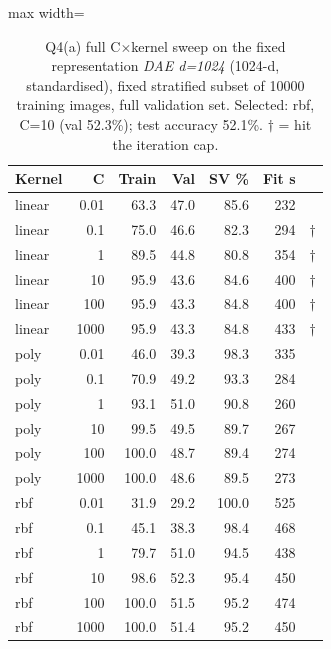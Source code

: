\begin{table}[t]
\centering
\footnotesize
\setlength{\tabcolsep}{3.5pt}
\begin{adjustbox}{max width=\linewidth}
\begin{tabular}{lrrrrrr}
\toprule
Kernel & C & Train & Val & SV \% & Fit s &  \\
\midrule
linear & 0.01 & 63.3 & 47.0 & 85.6 & 232 &  \\
linear & 0.1 & 75.0 & 46.6 & 82.3 & 294 & $\dagger$ \\
linear & 1 & 89.5 & 44.8 & 80.8 & 354 & $\dagger$ \\
linear & 10 & 95.9 & 43.6 & 84.6 & 400 & $\dagger$ \\
linear & 100 & 95.9 & 43.3 & 84.8 & 400 & $\dagger$ \\
linear & 1000 & 95.9 & 43.3 & 84.8 & 433 & $\dagger$ \\
poly & 0.01 & 46.0 & 39.3 & 98.3 & 335 &  \\
poly & 0.1 & 70.9 & 49.2 & 93.3 & 284 &  \\
poly & 1 & 93.1 & 51.0 & 90.8 & 260 &  \\
poly & 10 & 99.5 & 49.5 & 89.7 & 267 &  \\
poly & 100 & 100.0 & 48.7 & 89.4 & 274 &  \\
poly & 1000 & 100.0 & 48.6 & 89.5 & 273 &  \\
rbf & 0.01 & 31.9 & 29.2 & 100.0 & 525 &  \\
rbf & 0.1 & 45.1 & 38.3 & 98.4 & 468 &  \\
rbf & 1 & 79.7 & 51.0 & 94.5 & 438 &  \\
rbf & 10 & 98.6 & 52.3 & 95.4 & 450 &  \\
rbf & 100 & 100.0 & 51.5 & 95.2 & 474 &  \\
rbf & 1000 & 100.0 & 51.4 & 95.2 & 450 &  \\
\bottomrule
\end{tabular}
\end{adjustbox}
\caption{Q4(a) full C$\times$kernel sweep on the fixed representation \emph{DAE d=1024} (1024-d, standardised), fixed stratified subset of 10000 training images, full validation set. Selected: rbf, C=10 (val 52.3\%); test accuracy 52.1\%. $\dagger$ = hit the iteration cap.}
\label{tab:q4a}
\end{table}
